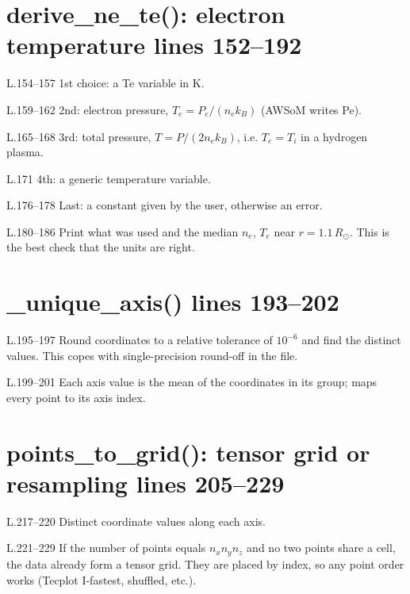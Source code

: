 \section*{\normalsize derive\_ne\_te(): electron temperature \hfill{\small\mdseries\color{gray}lines 152--192}}

\begin{lines}
\item[L.154–157] 1st choice: a Te variable in K.
\item[L.159–162] 2nd: electron pressure, $T_e=P_e/(n_ek_B)$ (AWSoM writes Pe).
\item[L.165–168] 3rd: total pressure, $T=P/(2n_ek_B)$, i.e. $T_e=T_i$ in a hydrogen plasma.
\item[L.171] 4th: a generic temperature variable.
\item[L.176–178] Last: a constant given by the user, otherwise an error.
\item[L.180–186] Print what was used and the median $n_e$, $T_e$ near $r=1.1\,R_\odot$. This is the best check that the units are right.
\end{lines}
\section*{\normalsize \_unique\_axis() \hfill{\small\mdseries\color{gray}lines 193--202}}

\begin{lines}
\item[L.195–197] Round coordinates to a relative tolerance of $10^{-6}$ and find the distinct values. This copes with single-precision round-off in the file.
\item[L.199–201] Each axis value is the mean of the coordinates in its group;  maps every point to its axis index.
\end{lines}
\section*{\normalsize points\_to\_grid(): tensor grid or resampling \hfill{\small\mdseries\color{gray}lines 205--229}}

\begin{lines}
\item[L.217–220] Distinct coordinate values along each axis.
\item[L.221–229] If the number of points equals $n_xn_yn_z$ and no two points share a cell, the data already form a tensor grid. They are placed by index, so any point order works (Tecplot I-fastest, shuffled, etc.).
\end{lines}
